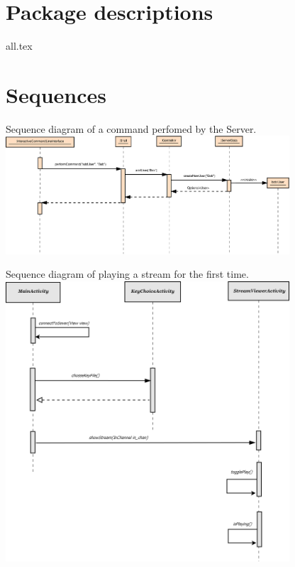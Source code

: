 \documentclass[a4paper,10pt]{scrartcl}
\begin{document}


\section{Package descriptions}

{all.tex}

\section{Sequences}
\begin{illustration}{Sequence diagram of a command perfomed by the Server.}
\includegraphics [width=400px] {figures/sequence_diagram_server/Server1.pdf}
\end{illustration}
\begin{illustration}{Sequence diagram of playing a stream for the first time.}
\includegraphics [width=400px] {figures/sequence_diagram_client/sequence_client.png}
\end{illustration}



%
\end{document}
